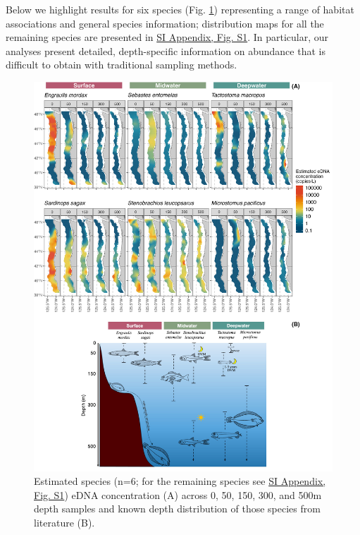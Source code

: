 \documentclass{article}
\begin{document}
Below we highlight results for six species (Fig. \ref{fig:fig1}) representing a range of habitat associations and general species information; distribution maps for all the remaining species are presented in \href{SI_Appendix.pdf}{SI Appendix, Fig. S1}. In particular, our analyses present detailed, depth-specific information on abundance that is difficult to obtain with traditional sampling methods.

\begin{figure}[tbhp]
\centering
\includegraphics[width=16cm]{plots/1_Figure_1.jpg}  %
\caption{Estimated species (n=6; for the remaining species see \href{SI_Appendix.pdf}{SI Appendix, Fig. S1}) eDNA concentration (A) across 0, 50, 150, 300, and 500m depth samples and known depth distribution of those species from literature (B).}
\label{fig:fig1}
\end{figure}
\end{document}
